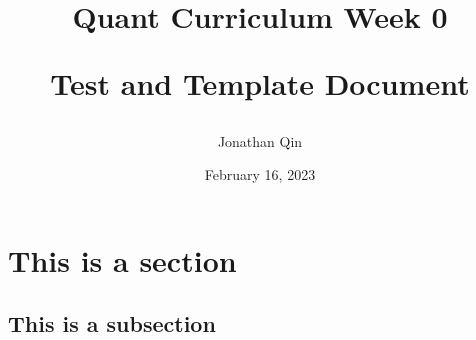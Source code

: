\documentclass{article}
\title{

\begin{center} \textbf{Quant Curriculum Week 0}

Test and Template Document \end{center}
}
\author{Jonathan Qin}
\date{February 16, 2023}
\begin{document}
\maketitle

\section{This is a section}

\subsection{This is a subsection}
\end{document}
